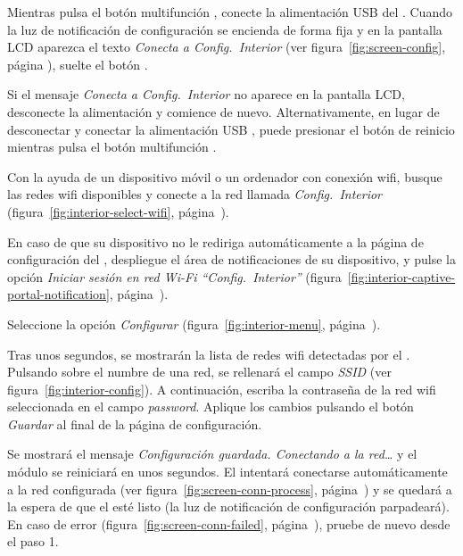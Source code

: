 \begin{enumeratecompact}

\item Mientras pulsa el botón multifunción , conecte la alimentación USB  del \MI. Cuando la luz de notificación de configuración  se encienda de forma fija y en la pantalla LCD  aparezca el texto \emph{Conecta a Config.~Interior} (ver figura~\ref{fig:screen-config}, página \pageref{fig:screen-config}), suelte el botón .

Si el mensaje \emph{Conecta a Config.~Interior} no aparece en la pantalla LCD, desconecte la alimentación y comience de nuevo. Alternativamente, en lugar de desconectar y conectar la alimentación USB , puede presionar el botón de reinicio  mientras pulsa el botón multifunción .

\item Con la ayuda de un dispositivo móvil o un ordenador con conexión wifi, busque las redes wifi disponibles y conecte a la red llamada \emph{Config.~Interior} (figura~\ref{fig:interior-select-wifi}, página~\pageref{fig:interior-select-wifi}).

\item En caso de que su dispositivo no le rediriga automáticamente a la página de configuración del \MI, despliegue el área de notificaciones de su dispositivo, y pulse la opción \emph{Iniciar sesión en red Wi-Fi ``Config.~Interior''} (figura~\ref{fig:interior-captive-portal-notification}, página~\pageref{fig:interior-captive-portal-notification}).

\item Seleccione la opción \emph{Configurar} (figura~\ref{fig:interior-menu}, página~\pageref{fig:interior-menu}).

\item Tras unos segundos, se mostrarán la lista de redes wifi detectadas por el \MI. Pulsando sobre el numbre de una red, se rellenará el campo \emph{SSID} (ver figura~\ref{fig:interior-config}). A continuación, escriba la contraseña de la red wifi seleccionada en el campo \emph{password}. Aplique los cambios pulsando el botón \emph{Guardar} al final de la página de configuración.

\item Se mostrará el mensaje \emph{Configuración guardada. Conectando a la red\ldots} y el módulo se reiniciará en unos segundos. El \MI intentará conectarse automáticamente a la red configurada (ver figura~\ref{fig:screen-conn-process}, página~\pageref{fig:screen-conn-process}) y se quedará a la espera de que el \MEE esté listo (la luz de notificación de configuración  parpadeará). En caso de error (figura~\ref{fig:screen-conn-failed}, página~\pageref{fig:screen-conn-failed}), pruebe de nuevo desde el paso 1.

\end{enumeratecompact}


